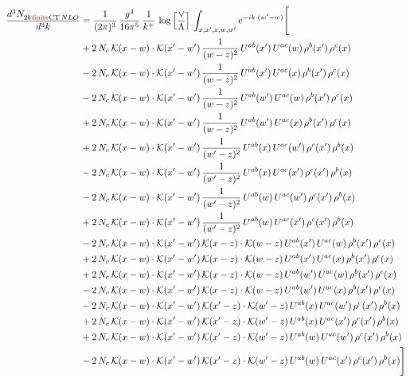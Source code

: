 \documentclass[9pt]{article}
\numberwithin{equation}{section}
\newcommand{\new}[1]{{\color{blue}#1}}
\newcommand{\old}[1]{{\color{red}#1}}
\begin{document}
\begin{align}
\frac{d^{3}N_{2b\,\old{\rm finite}\new{\rm CT}\, NLO}^{\rm}}{d^{3}k} & = \frac{1}{(2\pi)^{3}}\,\frac{g^{4}}{16\pi^{5}}\,\frac{1}{k^{+}}\,\log{\left[\frac{\vee}{\Lambda}\right]}\,\int_{x,x',z,w,w'}e^{-ik\cdot(w'-w)}\Bigg[\notag\\ & +2\,N_{c}\,\mathcal{K}(x-w)\cdot\mathcal{K}(x'-w')\,\frac{1}{(w-z)^{2}}\,U^{ab}(x')\,U^{ac}(w)\,\rho^{b}(x')\,\rho^{c}(x)\notag\\
&-2\,N_{c}\,\mathcal{K}(x-w)\cdot\mathcal{K}(x'-w')\,\frac{1}{(w-z)^{2}}\,U^{ab}(x')\,U^{ac}(x)\,\rho^{b}(x')\,\rho^{c}(x)\notag\\
&-2\,N_{c}\,\mathcal{K}(x-w)\cdot\mathcal{K}(x'-w')\,\frac{1}{(w-z)^{2}}\,U^{ab}(w')\,U^{ac}(w)\,\rho^{b}(x')\,\rho^{c}(x)\notag\\
&+2\,N_{c}\,\mathcal{K}(x-w)\cdot\mathcal{K}(x'-w')\,\frac{1}{(w-z)^{2}}\,U^{ab}(w')\,U^{ac}(x)\,\rho^{b}(x')\,\rho^{c}(x)\notag\\
&+2\,N_{c}\,\mathcal{K}(x-w)\cdot\mathcal{K}(x'-w')\,\frac{1}{(w'-z)^{2}}\,U^{ab}(x)\,U^{ac}(w')\,\rho^{c}(x')\,\rho^{b}(x)\notag\\
&-2\,N_{c}\,\mathcal{K}(x-w)\cdot\mathcal{K}(x'-w')\,\frac{1}{(w'-z)^{2}}\,U^{ab}(x)\,U^{ac}(x')\,\rho^{c}(x')\,\rho^{b}(x)\notag\\
&-2\,N_{c}\,\mathcal{K}(x-w)\cdot\mathcal{K}(x'-w')\,\frac{1}{(w'-z)^{2}}\,U^{ab}(w)\,U^{ac}(w')\,\rho^{c}(x')\,\rho^{b}(x)\notag\\
&+2\,N_{c}\,\mathcal{K}(x-w)\cdot\mathcal{K}(x'-w')\,\frac{1}{(w'-z)^{2}}\,U^{ab}(w)\,U^{ac}(x')\,\rho^{c}(x')\,\rho^{b}(x)\notag\\
&-2\,N_{c}\,\mathcal{K}(x-w)\cdot\mathcal{K}(x'-w')\,\mathcal{K}(x-z)\cdot\mathcal{K}(w-z)\,U^{ab}(x')\,U^{ac}(w)\,\rho^{b}(x')\,\rho^{c}(x)\notag\\
&+2\,N_{c}\,\mathcal{K}(x-w)\cdot\mathcal{K}(x'-w')\,\mathcal{K}(x-z)\cdot\mathcal{K}(w-z)\,U^{ab}(x')\,U^{ac}(x)\,\rho^{b}(x')\,\rho^{c}(x)\notag\\
&+2\,N_{c}\,\mathcal{K}(x-w)\cdot\mathcal{K}(x'-w')\,\mathcal{K}(x-z)\cdot\mathcal{K}(w-z)\,U^{ab}(w')\,U^{ac}(w)\,\rho^{b}(x')\,\rho^{c}(x)\notag\\
&-2\,N_{c}\,\mathcal{K}(x-w)\cdot\mathcal{K}(x'-w')\,\mathcal{K}(x-z)\cdot\mathcal{K}(w-z)\,U^{ab}(w')\,U^{ac}(x)\,\rho^{b}(x')\,\rho^{c}(x)\notag\\
&-2\,N_{c}\,\mathcal{K}(x-w)\cdot\mathcal{K}(x'-w')\,\mathcal{K}(x'-z)\cdot\mathcal{K}(w'-z)\,U^{ab}(x)\,U^{ac}(w')\,\rho^{c}(x')\,\rho^{b}(x)\notag\\
&+2\,N_{c}\,\mathcal{K}(x-w)\cdot\mathcal{K}(x'-w')\,\mathcal{K}(x'-z)\cdot\mathcal{K}(w'-z)\,U^{ab}(x)\,U^{ac}(x')\,\rho^{c}(x')\,\rho^{b}(x)\notag\\
&+2\,N_{c}\,\mathcal{K}(x-w)\cdot\mathcal{K}(x'-w')\,\mathcal{K}(x'-z)\cdot\mathcal{K}(w'-z)\,U^{ab}(w)\,U^{ac}(w')\,\rho^{c}(x')\,\rho^{b}(x)\notag\\
&-2\,N_{c}\,\mathcal{K}(x-w)\cdot\mathcal{K}(x'-w')\,\mathcal{K}(x'-z)\cdot\mathcal{K}(w'-z)\,U^{ab}(w)\,U^{ac}(x')\,\rho^{c}(x')\,\rho^{b}(x)\Bigg]
\end{align}
\end{document}

